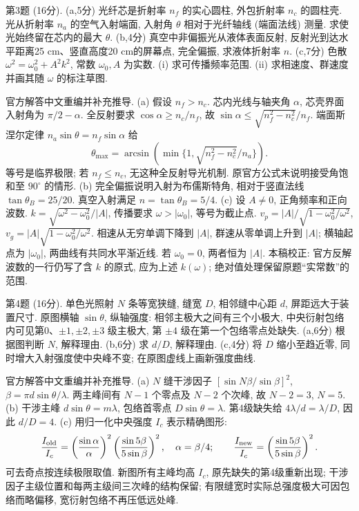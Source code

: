 \begin{exercise}\label{exam:f1.3}
第3题 (16分). (a,5分) 光纤芯是折射率 $n_f$ 的实心圆柱, 外包折射率 $n_c$ 的圆柱壳. 光从折射率 $n_a$ 的空气入射端面, 入射角 $\theta$ 相对于光纤轴线 (端面法线) 测量. 求使光始终留在芯内的最大 $\theta$. (b,4分) 真空中非偏振光从液体表面反射, 反射光到达水平距离25 cm、竖直高度20 cm的屏幕点, 完全偏振, 求液体折射率 $n$. (c,7分) 色散 $\omega^2=\omega_0^2+A^2k^2$, 常数 $\omega_0,A$ 为实数. (i) 求可传播频率范围. (ii) 求相速度、群速度并画其随 $\omega$ 的标注草图.
\end{exercise}
\begin{solution}
官方解答中文重编并补充推导. (a) 假设 $n_f>n_c$. 芯内光线与轴夹角 $\alpha$, 芯壳界面入射角为 $\pi/2-\alpha$. 全反射要求 $\cos\alpha\ge n_c/n_f$, 故 $\sin\alpha\le\sqrt{n_f^2-n_c^2}/n_f$. 端面斯涅尔定律 $n_a\sin\theta=n_f\sin\alpha$ 给
\[
\theta_{\max}=\arcsin\!\left(\min\{1,\sqrt{n_f^2-n_c^2}/n_a\}\right).
\]
等号是临界极限; 若 $n_f\le n_c$, 无这种全反射导光机制. 原官方公式未说明接受角饱和至 $90^\circ$ 的情形.
(b) 完全偏振说明入射为布儒斯特角, 相对于竖直法线 $\tan\theta_B=25/20$. 真空入射满足 $n=\tan\theta_B=5/4$.
(c) 设 $A\ne0$, 正角频率和正向波数. $k=\sqrt{\omega^2-\omega_0^2}/|A|$, 传播要求 $\omega>|\omega_0|$, 等号为截止点. $v_p=|A|/\sqrt{1-\omega_0^2/\omega^2}$, $v_g=|A|\sqrt{1-\omega_0^2/\omega^2}$. 相速从无穷单调下降到 $|A|$, 群速从零单调上升到 $|A|$; 横轴起点为 $|\omega_0|$, 两曲线有共同水平渐近线. 若 $\omega_0=0$, 两者恒为 $|A|$. 本稿校正: 官方反解波数的一行仍写了含 $k$ 的原式, 应为上述 $k(\omega)$; 绝对值处理保留原题``实常数''的范围.
\end{solution}
\begin{exercise}\label{exam:f1.4}
第4题 (16分). 单色光照射 $N$ 条等宽狭缝, 缝宽 $D$, 相邻缝中心距 $d$, 屏距远大于装置尺寸. 原图横轴 $\sin\theta$, 纵轴强度: 相邻主极大之间有三个小极大, 中央衍射包络内可见第0、$\pm1,\pm2,\pm3$ 级主极大, 第 $\pm4$ 级在第一个包络零点处缺失. (a,6分) 根据图判断 $N$, 解释理由. (b,6分) 求 $d/D$, 解释理由. (c,4分) 将 $D$ 缩小至趋近零, 同时增大入射强度使中央峰不变; 在原图虚线上画新强度曲线.
\end{exercise}
\begin{solution}
官方解答中文重编并补充推导. (a) $N$ 缝干涉因子 $[\sin N\beta/\sin\beta]^2$, $\beta=\pi d\sin\theta/\lambda$. 两主峰间有 $N-1$ 个零点及 $N-2$ 个次峰, 故 $N-2=3$, $N=5$.
(b) 干涉主峰 $d\sin\theta=m\lambda$, 包络首零点 $D\sin\theta=\lambda$. 第4级缺失给 $4\lambda/d=\lambda/D$, 因此 $d/D=4$.
(c) 用归一化中央强度 $I_c$ 表示精确图形:
\[
\frac{I_{\rm old}}{I_c}=\left(\frac{\sin\alpha}{\alpha}\right)^2\left(\frac{\sin5\beta}{5\sin\beta}\right)^2,
\quad \alpha=\beta/4;\qquad
\frac{I_{\rm new}}{I_c}=\left(\frac{\sin5\beta}{5\sin\beta}\right)^2.
\]
可去奇点按连续极限取值. 新图所有主峰均高 $I_c$, 原先缺失的第4级重新出现; 干涉因子主级位置和每两主级间三次峰的结构保留; 有限缝宽时实际总强度极大可因包络而略偏移, 宽衍射包络不再压低远处峰.
\end{solution}
